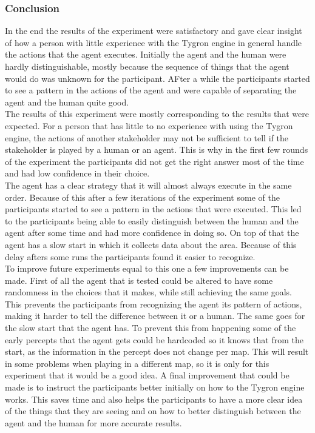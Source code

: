 \subsubsection{Conclusion}
In the end the results of the experiment were satisfactory and gave clear insight of how a person with little experience with the Tygron engine in general handle the actions that the agent executes. Initially the agent and the human were hardly distinguishable, mostly because the sequence of things that the agent would do was unknown for the participant. AFter a while the participants started to see a pattern in the actions of the agent and were capable of separating the agent and the human quite good.\\
The results of this experiment were mostly corresponding to the results that were expected. For a person that has little to no experience with using the Tygron engine, the actions of another stakeholder may not be sufficient to tell if the stakeholder is played by a human or an agent. This is why in the first few rounds of the experiment the participants did not get the right answer most of the time and had low confidence in their choice. \\ The agent has a clear strategy that it will almost always execute in the same order. Because of this after a few iterations of the experiment some of the participants started to see a pattern in the actions that were executed. This led to the participants being able to easily distinguish between the human and the agent after some time and had more confidence in doing so. On top of that the agent has a slow start in which it collects data about the area. Because of this delay afters some runs the participants found it easier to recognize. \\
To improve future experiments equal to this one a few improvements can be made. First of all the agent that is tested could be altered to have some randomness in the choices that it makes, while still achieving the same goals. This prevents the participants from recognizing the agent its pattern of actions, making it harder to tell the difference between it or a human. The same goes for the slow start that the agent has. To prevent this from happening some of the early percepts that the agent gets could be hardcoded so it knows that from the start, as the information in the percept does not change per map. This will result in some problems when playing in a different map, so it is only for this experiment that it would be a good idea. A final improvement that could be made is to instruct the participants better initially on how to the Tygron engine works. This saves time and also helps the participants to have a more clear idea of the things that they are seeing and on how to better distinguish between the agent and the human for more accurate results.

